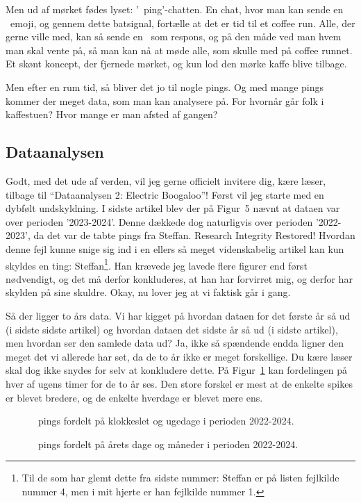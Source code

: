 \begin{article}
Men ud af mørket fødes lyset: '\coffee\ ping'-chatten.
En chat, hvor man kan sende en \coffee\ emoji, og gennem dette batsignal, fortælle at det er tid til et coffee run. Alle, der gerne ville med, kan så sende en \coffee\ som respons, og på den måde ved man hvem man skal vente på, så man kan nå at møde alle, som skulle med på coffee runnet. Et skønt koncept, der fjernede mørket, og kun lod den mørke kaffe blive tilbage.

Men efter en rum tid, så bliver det jo til nogle pings. Og med mange pings kommer der meget data, som man kan analysere på. For hvornår går folk i kaffestuen? Hvor mange er man afsted af gangen?


\subsection*{Dataanalysen}

Godt, med det ude af verden, vil jeg gerne officielt invitere dig, kære læser, tilbage til ``Dataanalysen 2: Electric Boogaloo''!
Først vil jeg starte med en dybfølt undskyldning. I sidste artikel blev der på Figur~5 nævnt at dataen var over perioden '2023-2024'. Denne dækkede dog naturligvis over perioden '2022-2023', da det var de tabte pings fra Steffan. Research Integrity Restored!
Hvordan denne fejl kunne snige sig ind i en ellers så meget videnskabelig artikel kan kun skyldes en ting: Steffan\footnote{Til de som har glemt dette fra sidste nummer: Steffan er på listen fejlkilde nummer 4, men i mit hjerte er han fejlkilde nummer 1.}. Han krævede jeg lavede flere figurer end først nødvendigt, og det må derfor konkluderes, at han har forvirret mig, og derfor har skylden på sine skuldre.
Okay, nu lover jeg at vi faktisk går i gang.

Så der ligger to års data. Vi har kigget på hvordan dataen for det første år så ud (i sidste sidste artikel) og hvordan dataen det sidste år så ud (i sidste artikel), men hvordan ser den samlede data ud? Ja, ikke så spændende endda ligner den meget det vi allerede har set, da de to år ikke er meget forskellige. Du kære læser skal dog ikke snydes for selv at konkludere dette. På Figur~\ref{fig:weekday_analysis_hour_2022-2024} kan fordelingen på hver af ugens timer for de to år ses. Den store forskel er mest at de enkelte spikes er blevet bredere, og de enkelte hverdage er blevet mere ens.

\begin{figure}[H]
	\centering
	\resizebox{\columnwidth}{!}{}
	\vspace{-20pt}
	\caption{\protect\coffee\ pings fordelt på klokkeslet og ugedage i perioden 2022-2024.}
	\label{fig:weekday_analysis_hour_2022-2024}
\end{figure}
\begin{figure*}[t!]
	\centering
	\resizebox{2\columnwidth}{!}{}
	\vspace{-15pt}
	\caption{\protect\coffee\ pings fordelt på årets dage og måneder i perioden 2022-2024.}
	\label{fig:year_analysis_2022-2024}
\end{figure*}


\end{article}
